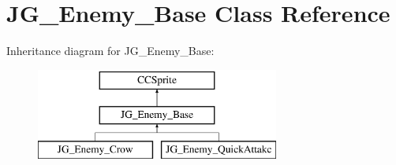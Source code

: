 \hypertarget{class_j_g___enemy___base}{\section{J\-G\-\_\-\-Enemy\-\_\-\-Base Class Reference}
\label{class_j_g___enemy___base}
}
Inheritance diagram for J\-G\-\_\-\-Enemy\-\_\-\-Base\-:\begin{figure}[H]
\begin{center}
\leavevmode
\includegraphics[height=3.000000cm]{class_j_g___enemy___base}
\end{center}
\end{figure}
